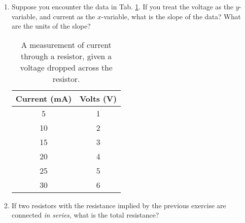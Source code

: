 \documentclass{article}
\begin{document}
\begin{enumerate}
\item Suppose you encounter the data in Tab. \ref{tab:t}.  If you treat the voltage as the $y$-variable, and current as the $x$-variable, what is the slope of the data?  What are the units of the slope? \\ \vspace{2cm}
\begin{table}[ht]
\centering
\begin{tabular}{| c | c |}
\hline
Current (mA) & Volts (V) \\ \hline
5 & 1 \\
10 & 2 \\
15 & 3 \\
20 & 4 \\
25 & 5 \\
30 & 6 \\ \hline
\end{tabular}
\caption{\label{tab:t} A measurement of current through a resistor, given a voltage dropped across the resistor.}
\end{table}
\item If two resistors with the resistance implied by the previous exercise are connected \textit{in series,} what is the total resistance?
\end{enumerate}
\end{document}
